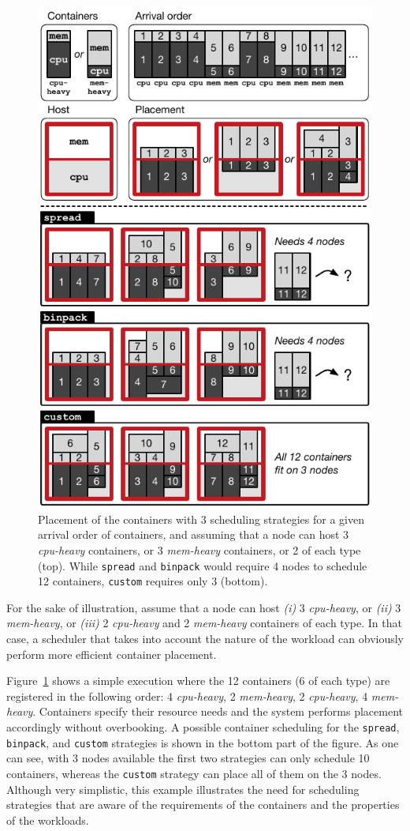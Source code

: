 \begin{figure}[t]
  \centering
  \includegraphics[width=.7\linewidth]{Figures/scenario}
  \caption{Placement of the containers with 3 scheduling strategies for a given arrival order of containers, and assuming that a node can host 3 \emph{cpu-heavy} containers, or 3 \emph{mem-heavy} containers, or 2 of each type (top). While \texttt{spread} and \texttt{binpack} would require 4 nodes to schedule 12 containers, \texttt{custom} requires only 3 (bottom).}
  \label{fig:motivating-placement}
\end{figure}

For the sake of illustration, assume that a node can host \emph{(i)} 3 \emph{cpu-heavy}, or \emph{(ii)} 3 \emph{mem-heavy}, or \emph{(iii)} 2 \emph{cpu-heavy} and 2 \emph{mem-heavy} containers of each type.
In that case, a scheduler that takes into account the nature of the workload can obviously perform more efficient container placement.

Figure~\ref{fig:motivating-placement} shows a simple execution where the 12 containers (6 of each type) are registered in the following order: 4 \emph{cpu-heavy}, 2 \emph{mem-heavy}, 2 \emph{cpu-heavy}, 4 \emph{mem-heavy}.
Containers specify their resource needs and the system performs placement accordingly without overbooking.
A possible container scheduling for the \texttt{spread}, \texttt{binpack}, and \texttt{custom} strategies is shown in the bottom part of the figure.
As one can see, with 3 nodes available the first two strategies can only schedule 10 containers, whereas the \texttt{custom} strategy can place all of them on the 3 nodes.
Although very simplistic, this example illustrates the need for scheduling strategies that are aware of the requirements of the containers and the properties of the workloads.

